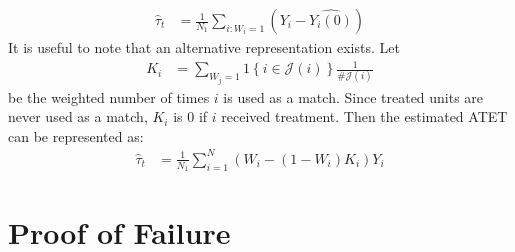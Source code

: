 \documentclass[10pt,letterpaper]{article}
\begin{document}
\begin{align}
\hat{\tau}_t &= \frac{1}{N_1} \sum_{i: W_i = 1} \left( Y_i - \widehat{Y_i(0)}\right)
\end{align}
It is useful to note that an alternative representation exists. Let
\begin{align}
K_i &= \sum_{W_j = 1} 1\left\{i \in \mathcal{J}(i)\right\} \frac{1}{\# \mathcal{J}(i)}
\end{align}
be the weighted number of times $i$ is used as a match. Since treated units are never used as a match, $K_i$ is 0 if $i$ received treatment. Then the estimated ATET can be represented as:
\begin{align}
\hat{\tau}_t &=\frac{1}{N_1} \sum_{i = 1}^{N} \left(W_i - (1 - W_i) K_i \right) Y_i
\end{align}

\section{Proof of Failure}
\end{document}
